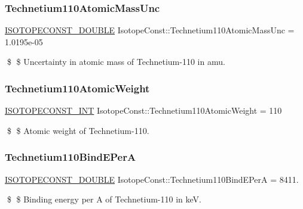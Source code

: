 \subsubsection{\texorpdfstring{Technetium110\+Atomic\+Mass\+Unc}{Technetium110AtomicMassUnc}}
{\footnotesize\ttfamily \mbox{\hyperlink{group___isotope_const-_macros_ga8f45a7272ce02c0b4c65c44636ed719a}{I\+S\+O\+T\+O\+P\+E\+C\+O\+N\+S\+T\+\_\+\+D\+O\+U\+B\+LE}} Isotope\+Const\+::\+Technetium110\+Atomic\+Mass\+Unc = 1.\+0195e-\/05}

\$ \$ Uncertainty in atomic mass of Technetium-\/110 in amu. \mbox{\label{group___isotope_const-_technetium-_tc110_gabfdb3de86be8f04d4f440d082da07cd5}} 
\subsubsection{\texorpdfstring{Technetium110\+Atomic\+Weight}{Technetium110AtomicWeight}}
{\footnotesize\ttfamily \mbox{\hyperlink{group___isotope_const-_macros_ga5f18360b3e99483a35c32d789e62621c}{I\+S\+O\+T\+O\+P\+E\+C\+O\+N\+S\+T\+\_\+\+I\+NT}} Isotope\+Const\+::\+Technetium110\+Atomic\+Weight = 110}

\$ \$ Atomic weight of Technetium-\/110. \mbox{\label{group___isotope_const-_technetium-_tc110_ga64a4a6bf49068814cdc8bb3e42360310}} 
\subsubsection{\texorpdfstring{Technetium110\+Bind\+E\+PerA}{Technetium110BindEPerA}}
{\footnotesize\ttfamily \mbox{\hyperlink{group___isotope_const-_macros_ga8f45a7272ce02c0b4c65c44636ed719a}{I\+S\+O\+T\+O\+P\+E\+C\+O\+N\+S\+T\+\_\+\+D\+O\+U\+B\+LE}} Isotope\+Const\+::\+Technetium110\+Bind\+E\+PerA = 8411.}

\$ \$ Binding energy per A of Technetium-\/110 in keV. \mbox{\label{group___isotope_const-_technetium-_tc110_gaf8ff8cf9533a0b07b5f7d2965b7e978f}} 
